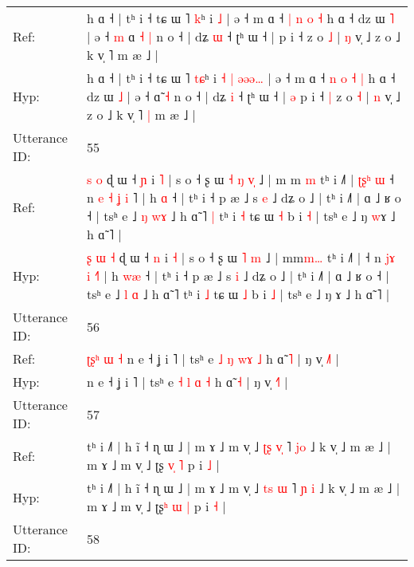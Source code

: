 \documentclass[10pt]{article}
\DeclareRobustCommand{\hl}[1]{{\textcolor{red}{#1}}}
\begin{document}
\begin{longtable}{ll}
Ref: & h ɑ ˧ | tʰ i ˧ tɕ ɯ ˥ \hl{}\hl{k}ʰ i\hl{}\hl{}\hl{}\hl{} \hl{}\hl{}\hl{}\hl{˩} | ə ˧ m ɑ ˧ \hl{|} \hl{n} \hl{o} \hl{˧} h ɑ ˧ dz ɯ \hl{˥} | ə ˧\hl{ }\hl{m} ɑ\hl{ }\hl{˧} \hl{|} n o ˧ | dʑ \hl{ɯ} ˧ ʈʰ ɯ ˧ |\hl{}\hl{} p i ˧\hl{}\hl{} z o \hl{˩} | \hl{ŋ} v̩ ˩ z o ˩ k v̩ ˥\hl{}\hl{} m æ ˩ |
 \\
Hyp: & h ɑ ˧ | tʰ i ˧ tɕ ɯ ˥ \hl{t}\hl{ɕ}ʰ i\hl{ }\hl{˧}\hl{ }\hl{|} \hl{ə}\hl{ə}\hl{ə}\hl{…} | ə ˧ m ɑ ˧ \hl{n} \hl{o} \hl{˧} \hl{|} h ɑ ˧ dz ɯ \hl{˩} | ə ˧\hl{}\hl{} ɑ\hl{}\hl{̃} \hl{˧} n o ˧ | dʑ \hl{i} ˧ ʈʰ ɯ ˧ |\hl{ }\hl{ə} p i ˧\hl{ }\hl{|} z o \hl{˧} | \hl{n} v̩ ˩ z o ˩ k v̩ ˥\hl{ }\hl{|} m æ ˩ |
 \\
\midrule
Utterance ID: & 55 \\
Ref: & \hl{}\hl{}\hl{s} \hl{o} ɖ ɯ ˧ \hl{ɲ} i \hl{˥} | s o ˧ ʂ ɯ\hl{ }\hl{˧} \hl{ŋ} \hl{v}\hl{̩} ˩ | m\hl{ }m\hl{ }\hl{m} tʰ i ˩˥ |\hl{ }\hl{ʈ}\hl{ʂ}\hl{ʰ}\hl{ }\hl{ɯ} ˧ n \hl{e}\hl{ }\hl{˧} \hl{ʝ} \hl{i}\hl{ }˥ | h \hl{}\hl{ɑ} ˧ | tʰ i ˧ p æ ˩ s \hl{e} ˩ dʑ o ˩ | tʰ i ˩˥ | ɑ ˩ ʁ o ˧ | tsʰ e ˩ \hl{ŋ} \hl{w}\hl{ɤ} ˩ h ɑ̃ ˥\hl{ }\hl{|} tʰ i \hl{˧} tɕ ɯ \hl{˧} b i \hl{˧} | tsʰ e ˩ ŋ \hl{w}ɤ ˩ h ɑ̃ ˥ |
 \\
Hyp: & \hl{ʂ}\hl{ }\hl{ɯ} \hl{˧} ɖ ɯ ˧ \hl{n} i \hl{˧} | s o ˧ ʂ ɯ\hl{}\hl{} \hl{˥} \hl{}\hl{m} ˩ | m\hl{}m\hl{m}\hl{…} tʰ i ˩˥ |\hl{}\hl{}\hl{}\hl{}\hl{}\hl{} ˧ n \hl{}\hl{j}\hl{ɤ} \hl{i} \hl{}\hl{˧}˥ | h \hl{w}\hl{æ} ˧ | tʰ i ˧ p æ ˩ s \hl{i} ˩ dʑ o ˩ | tʰ i ˩˥ | ɑ ˩ ʁ o ˧ | tsʰ e ˩ \hl{l} \hl{}\hl{ɑ} ˩ h ɑ̃ ˥\hl{}\hl{} tʰ i \hl{˩} tɕ ɯ \hl{˩} b i \hl{˩} | tsʰ e ˩ ŋ \hl{}ɤ ˩ h ɑ̃ ˥ |
 \\
\midrule
Utterance ID: & 56 \\
Ref: & \hl{ʈ}\hl{ʂ}\hl{ʰ}\hl{ }\hl{ɯ}\hl{ }\hl{˧}\hl{ }n e ˧ ʝ i ˥ | tsʰ e \hl{˩} \hl{ŋ} \hl{w}\hl{ɤ} \hl{˩} h ɑ̃ \hl{˥} | ŋ v̩ \hl{˩}˥ |
 \\
Hyp: & \hl{}\hl{}\hl{}\hl{}\hl{}\hl{}\hl{}\hl{}n e ˧ ʝ i ˥ | tsʰ e \hl{˧} \hl{l} \hl{}\hl{ɑ} \hl{˧} h ɑ̃ \hl{˧} | ŋ v̩ \hl{˧}˥ |
 \\
\midrule
Utterance ID: & 57 \\
Ref: & tʰ i ˩˥ | h ĩ ˧ ɳ ɯ ˩ | m ɤ ˩ m v̩ ˩ \hl{ʈ}\hl{ʂ} \hl{v}\hl{̩} ˥ \hl{}\hl{j}\hl{o} ˩ k v̩ ˩ m æ ˩ | m ɤ ˩ m v̩ ˩ ʈʂ\hl{ }\hl{v}\hl{̩} \hl{˥} p i \hl{˩} |
 \\
Hyp: & tʰ i ˩˥ | h ĩ ˧ ɳ ɯ ˩ | m ɤ ˩ m v̩ ˩ \hl{t}\hl{s} \hl{}\hl{ɯ} ˥ \hl{ɲ}\hl{ }\hl{i} ˩ k v̩ ˩ m æ ˩ | m ɤ ˩ m v̩ ˩ ʈʂ\hl{ʰ}\hl{ }\hl{ɯ} \hl{|} p i \hl{˧} |
 \\
\midrule
Utterance ID: & 58 \\

\end{longtable}
\end{document}
